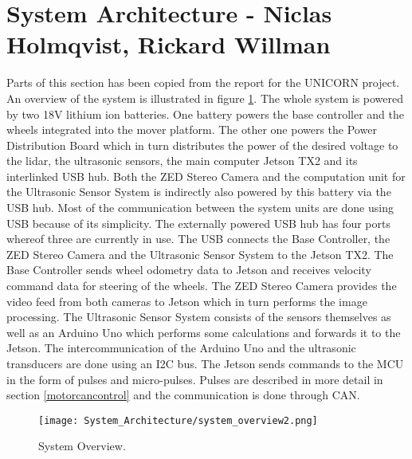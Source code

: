 \section{System Architecture - Niclas Holmqvist, Rickard Willman}
Parts of this section has been copied from the report for the UNICORN project.\\
\indent An  overview  of  the  system  is  illustrated  in  figure  \ref{fig:system_overview}.   The  whole  system  is  powered  by  two  18V
lithium ion batteries.  One battery powers the base controller and the wheels integrated into the
mover platform.  The other one powers the Power Distribution Board which in turn distributes
the power of the desired voltage to the lidar,  the ultrasonic sensors,  the main computer Jetson
TX2 and its interlinked USB hub.  Both the ZED Stereo Camera and the computation unit for
the Ultrasonic Sensor System is indirectly also powered by this battery via the USB hub.  Most of
the communication between the system units are done using USB because of its simplicity.  The
externally powered USB hub has four ports whereof three are currently in use.  The USB connects
the Base Controller, the ZED Stereo Camera and the Ultrasonic Sensor System to the Jetson TX2.
The  Base  Controller  sends wheel odometry  data  to Jetson  and  receives  velocity  command  data
for steering of the wheels.  The ZED Stereo Camera provides the video feed from both cameras
to Jetson which in turn performs the image processing.  The Ultrasonic Sensor System consists of
the sensors themselves as well as an Arduino Uno which performs some calculations and forwards
it to the Jetson.  The intercommunication of the Arduino Uno and the ultrasonic transducers are
done using an I2C bus. The Jetson sends commands to the MCU in the form of pulses and micro-pulses. Pulses are described in more detail in section \ref{motorcancontrol} and the communication is done through CAN.
\begin{figure}
  \texttt{[image: System\_Architecture/system\_overview2.png]}
  \caption{System Overview.}
  \label{fig:system_overview}
\end{figure}


